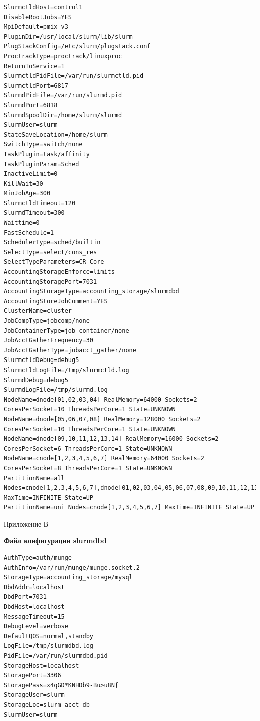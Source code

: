 \documentclass[a4paper]{extarticle}
\begin{document}
\begin{verbatim}
SlurmctldHost=control1
DisableRootJobs=YES
MpiDefault=pmix_v3
PluginDir=/usr/local/slurm/lib/slurm
PlugStackConfig=/etc/slurm/plugstack.conf
ProctrackType=proctrack/linuxproc
ReturnToService=1
SlurmctldPidFile=/var/run/slurmctld.pid
SlurmctldPort=6817
SlurmdPidFile=/var/run/slurmd.pid
SlurmdPort=6818
SlurmdSpoolDir=/home/slurm/slurmd
SlurmUser=slurm
StateSaveLocation=/home/slurm
SwitchType=switch/none
TaskPlugin=task/affinity
TaskPluginParam=Sched
InactiveLimit=0
KillWait=30
MinJobAge=300
SlurmctldTimeout=120
SlurmdTimeout=300
Waittime=0
FastSchedule=1
SchedulerType=sched/builtin
SelectType=select/cons_res
SelectTypeParameters=CR_Core
AccountingStorageEnforce=limits
AccountingStoragePort=7031
AccountingStorageType=accounting_storage/slurmdbd
AccountingStoreJobComment=YES
ClusterName=cluster
JobCompType=jobcomp/none
JobContainerType=job_container/none
JobAcctGatherFrequency=30
JobAcctGatherType=jobacct_gather/none
SlurmctldDebug=debug5
SlurmctldLogFile=/tmp/slurmctld.log
SlurmdDebug=debug5
SlurmdLogFile=/tmp/slurmd.log
NodeName=dnode[01,02,03,04] RealMemory=64000 Sockets=2 CoresPerSocket=10 ThreadsPerCore=1 State=UNKNOWN
NodeName=dnode[05,06,07,08] RealMemory=128000 Sockets=2 CoresPerSocket=10 ThreadsPerCore=1 State=UNKNOWN
NodeName=dnode[09,10,11,12,13,14] RealMemory=16000 Sockets=2 CoresPerSocket=6 ThreadsPerCore=1 State=UNKNOWN
NodeName=cnode[1,2,3,4,5,6,7] RealMemory=64000 Sockets=2 CoresPerSocket=8 ThreadsPerCore=1 State=UNKNOWN
PartitionName=all Nodes=cnode[1,2,3,4,5,6,7],dnode[01,02,03,04,05,06,07,08,09,10,11,12,13,14] MaxTime=INFINITE State=UP
PartitionName=uni Nodes=cnode[1,2,3,4,5,6,7] MaxTime=INFINITE State=UP
\end{verbatim}

\newpage

\begin{flushright}Приложение В\end{flushright}
\centerline{\textbf{Файл конфигурации slurmdbd}}

\begin{verbatim}
AuthType=auth/munge
AuthInfo=/var/run/munge/munge.socket.2
StorageType=accounting_storage/mysql
DbdAddr=localhost
DbdPort=7031
DbdHost=localhost
MessageTimeout=15
DebugLevel=verbose
DefaultQOS=normal,standby
LogFile=/tmp/slurmdbd.log
PidFile=/var/run/slurmdbd.pid
StorageHost=localhost
StoragePort=3306
StoragePass=x4qGD*KNHDb9-Bu>u8N{
StorageUser=slurm
StorageLoc=slurm_acct_db
SlurmUser=slurm
\end{verbatim}
\end{document}
